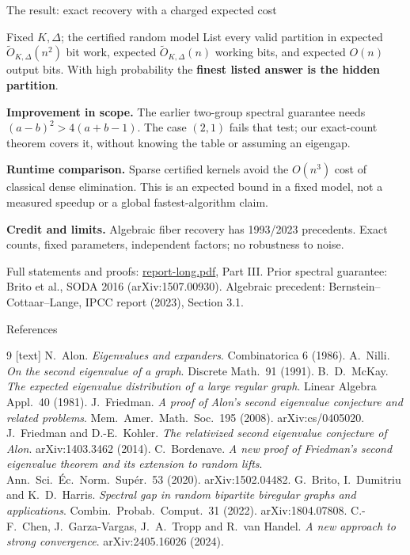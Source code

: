\documentclass[aspectratio=169,10pt]{beamer}
\begin{document}
\begin{frame}{The result: exact recovery with a charged expected cost}
  \setlength{\parskip}{0.3em}
  \begin{block}{Fixed $K,\Delta$; the certified random model}
  List every valid partition in expected $\widetilde O_{K,\Delta}(n^2)$ bit work,
  expected $\widetilde O_{K,\Delta}(n)$ working bits, and expected $O(n)$ output bits.
  With high probability the \textbf{finest listed answer is the hidden partition}.
  \end{block}
  \small \textbf{Improvement in scope.} The earlier two-group spectral guarantee needs
  $(a-b)^2>4(a+b-1)$. The case $(2,1)$ fails that test; our exact-count
  theorem covers it, without knowing the table or assuming an eigengap.

  \textbf{Runtime comparison.} Sparse certified kernels avoid the $O(n^3)$
  cost of classical dense elimination. This is an expected bound in a fixed model,
  not a measured speedup or a global fastest-algorithm claim.

  \textbf{Credit and limits.} Algebraic fiber recovery has 1993/2023 precedents.
  Exact counts, fixed parameters, independent factors; no robustness to noise.
  \par\vspace{1mm}\scriptsize
  Full statements and proofs: \href{report-long.pdf}{report-long.pdf}, Part III.
  Prior spectral guarantee: Brito et al., SODA 2016 (arXiv:1507.00930).
  Algebraic precedent: Bernstein--Cottaar--Lange, IPCC report (2023), Section 3.1.
\end{frame}

\begin{frame}{References}
  \scriptsize
  \begin{thebibliography}{9}
    [text]
    \setlength{\itemsep}{0.5mm}
     N.~Alon. \emph{Eigenvalues and expanders}. Combinatorica 6 (1986).
     A.~Nilli. \emph{On the second eigenvalue of a graph}. Discrete Math.\ 91 (1991).
     B.~D.~McKay. \emph{The expected eigenvalue distribution of a large regular graph}.
      Linear Algebra Appl.\ 40 (1981).
     J.~Friedman. \emph{A proof of Alon's second eigenvalue conjecture and related problems}.
      Mem.\ Amer.\ Math.\ Soc.\ 195 (2008). arXiv:cs/0405020.
     J.~Friedman and D.-E.~Kohler. \emph{The relativized second eigenvalue conjecture of Alon}.
      arXiv:1403.3462 (2014).
     C.~Bordenave. \emph{A new proof of Friedman's second eigenvalue theorem and its extension to random lifts}.
      Ann.\ Sci.\ \'Ec.\ Norm.\ Sup\'er.\ 53 (2020). arXiv:1502.04482.
     G.~Brito, I.~Dumitriu and K.~D.~Harris. \emph{Spectral gap in random bipartite biregular graphs and applications}.
      Combin.\ Probab.\ Comput.\ 31 (2022). arXiv:1804.07808.
     C.-F.~Chen, J.~Garza-Vargas, J.~A.~Tropp and R.~van Handel. \emph{A new approach to strong convergence}.
      arXiv:2405.16026 (2024).
  \end{thebibliography}
\end{frame}
\end{document}

